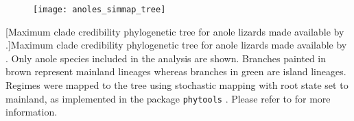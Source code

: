 \begin{figure}[h]
	\centering
	\texttt{[image: anoles\_simmap\_tree]}
\end{figure}
\clearpage %
[Maximum clade credibility phylogenetic tree for anole lizards made available by \citet{gamble_anolis_2014}.]{Maximum clade credibility phylogenetic tree for anole lizards made available by \citet{gamble_anolis_2014}. Only anole species included in the analysis are shown. Branches painted in brown represent mainland lineages whereas branches in green are island lineages. Regimes were mapped to the tree using stochastic mapping with root state set to mainland, as implemented in the package \texttt{phytools} \citep{revell_phytools:_2012}. Please refer to \citet{caetano_sysbio_2017} for more information.}
\label{fig:anoles_simmap}
